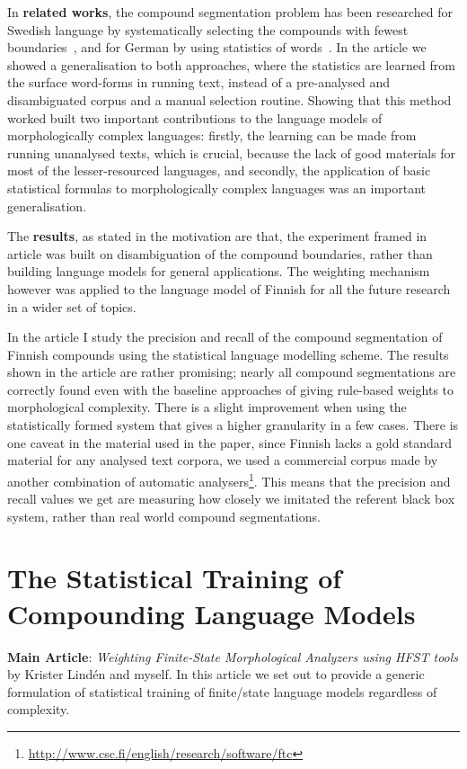 \documentclass[officiallayout]{unihelcompling}
\begin{document}
In \textbf{related works}, the compound segmentation problem has been
researched for Swedish language by systematically selecting the compounds with
fewest boundaries~\citep{karlsson1992swetwol}, and for German by using
statistics of words~\citep{schiller2006german}. In the article we showed a
generalisation to both approaches, where the statistics are learned from the
surface word-forms in running text, instead of a pre-analysed and disambiguated
corpus and a manual selection routine.  Showing that this method worked built
two important contributions to the language models of morphologically complex
languages: firstly, the learning can be made from running unanalysed texts,
which is crucial, because the lack of good materials for most of the
lesser-resourced languages, and secondly, the application of basic statistical
formulas to morphologically complex languages was an important generalisation.

The \textbf{results}, as stated in the motivation are that, the experiment
framed in article was built on disambiguation of the compound boundaries,
rather than building language models for general applications. The weighting
mechanism however was applied to the language model of Finnish for all the
future research in a wider set of topics.

In the article I study the precision and recall of the compound segmentation of
Finnish compounds using the statistical language modelling scheme. The results
shown in the article are rather promising; nearly all compound segmentations
are correctly found even with the baseline approaches of giving rule-based
weights to morphological complexity. There is a slight improvement when using
the statistically formed system that gives a higher granularity in a few cases.
There is one caveat in the material used in the paper, since Finnish lacks a
gold standard material for any analysed text corpora, we used a commercial
corpus made by another combination of automatic
analysers\footnote{\url{http://www.csc.fi/english/research/software/ftc}}. This
means that the precision and recall values we get are measuring how closely we
imitated the referent black box system, rather than real world compound
segmentations.

\section{The Statistical Training of Compounding Language Models}
\label{sec:training-compounds}

\textbf{Main Article}: \emph{Weighting Finite-State Morphological Analyzers
using HFST tools} by Krister Lindén and myself. In this article we set out
to provide a generic formulation of statistical training of finite\-/state
language models regardless of complexity.
\end{document}
